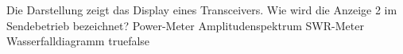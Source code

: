     {Die Darstellung zeigt das Display eines Transceivers. Wie wird die Anzeige 2 im Sendebetrieb bezeichnet?}
    {Power-Meter}
    {Amplitudenspektrum}
    {SWR-Meter}
    {Wasserfalldiagramm}
    {true}{false}
